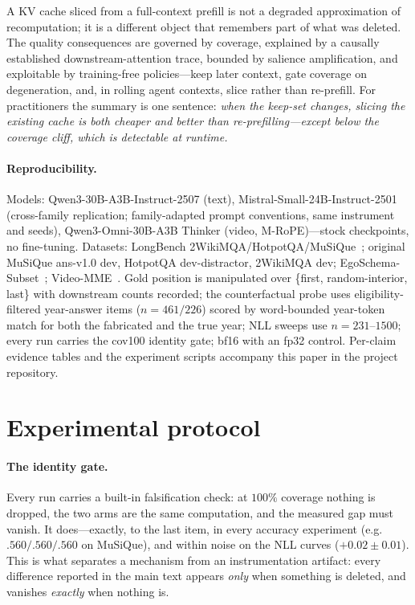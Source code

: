 \documentclass[11pt]{article}
\begin{document}
A KV cache sliced from a full-context prefill is not a degraded approximation of recomputation; it is a different object that remembers part of what was deleted. The quality consequences are governed by coverage, explained by a causally established downstream-attention trace, bounded by salience amplification, and exploitable by training-free policies---keep later context, gate coverage on degeneration, and, in rolling agent contexts, slice rather than re-prefill. For practitioners the summary is one sentence: \emph{when the keep-set changes, slicing the existing cache is both cheaper and better than re-prefilling---except below the coverage cliff, which is detectable at runtime.}

\paragraph{Reproducibility.}
Models: Qwen3-30B-A3B-Instruct-2507 (text), Mistral-Small-24B-Instruct-2501 (cross-family replication; family-adapted prompt conventions, same instrument and seeds), Qwen3-Omni-30B-A3B Thinker (video, M-RoPE)---stock checkpoints, no fine-tuning. Datasets: LongBench 2WikiMQA/HotpotQA/MuSiQue~\cite{longbench,musique,hotpotqa,twowiki}; original MuSiQue ans-v1.0 dev, HotpotQA dev-distractor, 2WikiMQA dev; EgoSchema-Subset~\cite{egoschema}; Video-MME~\cite{videomme}. Gold position is manipulated over \{first, random-interior, last\} with downstream counts recorded; the counterfactual probe uses eligibility-filtered year-answer items ($n=461/226$) scored by word-bounded year-token match for both the fabricated and the true year; NLL sweeps use $n=231$--$1500$; every run carries the cov100 identity gate; bf16 with an fp32 control. Per-claim evidence tables and the experiment scripts accompany this paper in the project repository.

\appendix

\section{Experimental protocol}
\label{app:protocol}

\paragraph{The identity gate.}
Every run carries a built-in falsification check: at $100\%$ coverage nothing is dropped, the two arms are the same computation, and the measured gap must vanish. It does---exactly, to the last item, in every accuracy experiment (e.g.\ $.560/.560/.560$ on MuSiQue), and within noise on the NLL curves ($+0.02\pm0.01$). This is what separates a mechanism from an instrumentation artifact: every difference reported in the main text appears \emph{only} when something is deleted, and vanishes \emph{exactly} when nothing is.
\end{document}
